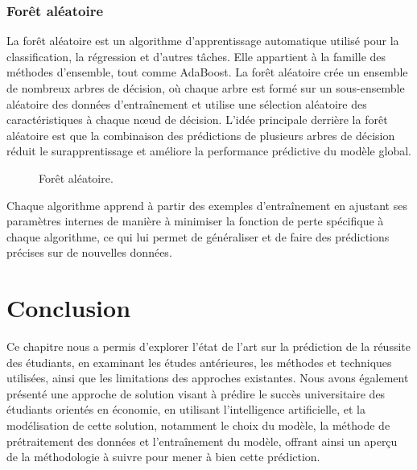 \subsubsection{Forêt aléatoire}
La forêt aléatoire est un algorithme d'apprentissage automatique utilisé pour la classification, la régression et d'autres tâches. Elle appartient à la famille des méthodes d'ensemble, tout comme AdaBoost. La forêt aléatoire crée un ensemble de nombreux arbres de décision, où chaque arbre est formé sur un sous-ensemble aléatoire des données d'entraînement et utilise une sélection aléatoire des caractéristiques à chaque nœud de décision. L'idée principale derrière la forêt aléatoire est que la combinaison des prédictions de plusieurs arbres de décision réduit le surapprentissage et améliore la performance prédictive du modèle global.
\begin{figure}[H]%
    \center%
    \setlength{\fboxsep}{5pt}%
    \setlength{\fboxrule}{0.5pt}%
    \caption{Forêt aléatoire.}%
\end{figure}

Chaque algorithme apprend à partir des exemples d'entraînement en ajustant ses paramètres internes de manière à minimiser la fonction de perte spécifique à chaque algorithme, ce qui lui permet de généraliser et de faire des prédictions précises sur de nouvelles données.

\section{Conclusion}
Ce chapitre nous a permis d'explorer l'état de l'art sur la prédiction de la réussite des étudiants, en examinant les études antérieures, les méthodes et techniques utilisées, ainsi que les limitations des approches existantes. Nous avons également présenté une approche de solution visant à prédire le succès universitaire des étudiants orientés en économie, en utilisant l'intelligence artificielle, et la modélisation de cette solution, notamment le choix du modèle, la méthode de prétraitement des données et l'entraînement du modèle, offrant ainsi un aperçu de la méthodologie à suivre pour mener à bien cette prédiction.
